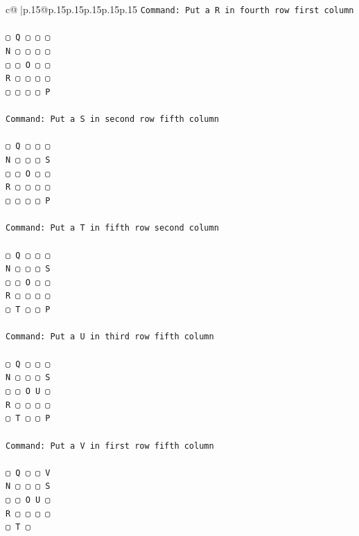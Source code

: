\documentclass{article}
\begin{document}
{\begin{supertabular}{c@{$\;$}|p{.15\linewidth}@{}p{.15\linewidth}p{.15\linewidth}p{.15\linewidth}p{.15\linewidth}p{.15\linewidth}}
{{{\texttt{Command: Put a R in fourth row first column} \\
\\ 
\texttt{▢ Q ▢ ▢ ▢} \\
\texttt{N ▢ ▢ ▢ ▢} \\
\texttt{▢ ▢ O ▢ ▢} \\
\texttt{R ▢ ▢ ▢ ▢} \\
\texttt{▢ ▢ ▢ ▢ P} \\
\\ 
\texttt{Command: Put a S in second row fifth column} \\
\\ 
\texttt{▢ Q ▢ ▢ ▢} \\
\texttt{N ▢ ▢ ▢ S} \\
\texttt{▢ ▢ O ▢ ▢} \\
\texttt{R ▢ ▢ ▢ ▢} \\
\texttt{▢ ▢ ▢ ▢ P} \\
\\ 
\texttt{Command: Put a T in fifth row second column} \\
\\ 
\texttt{▢ Q ▢ ▢ ▢} \\
\texttt{N ▢ ▢ ▢ S} \\
\texttt{▢ ▢ O ▢ ▢} \\
\texttt{R ▢ ▢ ▢ ▢} \\
\texttt{▢ T ▢ ▢ P} \\
\\ 
\texttt{Command: Put a U in third row fifth column} \\
\\ 
\texttt{▢ Q ▢ ▢ ▢} \\
\texttt{N ▢ ▢ ▢ S} \\
\texttt{▢ ▢ O U ▢} \\
\texttt{R ▢ ▢ ▢ ▢} \\
\texttt{▢ T ▢ ▢ P} \\
\\ 
\texttt{Command: Put a V in first row fifth column} \\
\\ 
\texttt{▢ Q ▢ ▢ V} \\
\texttt{N ▢ ▢ ▢ S} \\
\texttt{▢ ▢ O U ▢} \\
\texttt{R ▢ ▢ ▢ ▢} \\
\texttt{▢ T ▢} \\
            }
        }
    }
     \\ \\


\end{supertabular}}
\end{document}
